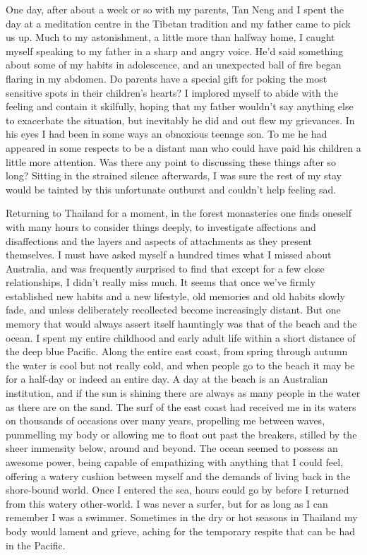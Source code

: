 One day, after about a week or so with my parents, Tan Neng and I spent
the day at a meditation centre in the Tibetan tradition and my father
came to pick us up. Much to my astonishment, a little more than halfway
home, I caught myself speaking to my father in a sharp and angry voice.
He'd said something about some of my habits in adolescence, and an
unexpected ball of fire began flaring in my abdomen. Do parents have a
special gift for poking the most sensitive spots in their children's
hearts? I implored myself to abide with the feeling and contain it
skilfully, hoping that my father wouldn't say anything else to
exacerbate the situation, but inevitably he did and out flew my
grievances. In his eyes I had been in some ways an obnoxious teenage
son. To me he had appeared in some respects to be a distant man who
could have paid his children a little more attention. Was there any
point to discussing these things after so long? Sitting in the strained
silence afterwards, I was sure the rest of my stay would be tainted by
this unfortunate outburst and couldn't help feeling sad.

Returning to Thailand for a moment, in the forest monasteries one finds
oneself with many hours to consider things deeply, to investigate
affections and disaffections and the layers and aspects of attachments
as they present themselves. I must have asked myself a hundred times
what I missed about Australia, and was frequently surprised to find that
except for a few close relationships, I didn't really miss much. It
seems that once we've firmly established new habits and a new lifestyle,
old memories and old habits slowly fade, and unless deliberately
recollected become increasingly distant. But one memory that would
always assert itself hauntingly was that of the beach and the ocean. I
spent my entire childhood and early adult life within a short distance
of the deep blue Pacific. Along the entire east coast, from spring
through autumn the water is cool but not really cold, and when people go
to the beach it may be for a half-day or indeed an entire day. A day at
the beach is an Australian institution, and if the sun is shining there
are always as many people in the water as there are on the sand. The
surf of the east coast had received me in its waters on thousands of
occasions over many years, propelling me between waves, pummelling my
body or allowing me to float out past the breakers, stilled by the sheer
immensity below, around and beyond. The ocean seemed to possess an
awesome power, being capable of empathizing with anything that I could
feel, offering a watery cushion between myself and the demands of living
back in the shore-bound world. Once I entered the sea, hours could go by
before I returned from this watery other-world. I was never a surfer,
but for as long as I can remember I was a swimmer. Sometimes in the dry
or hot seasons in Thailand my body would lament and grieve, aching for
the temporary respite that can be had in the Pacific.

